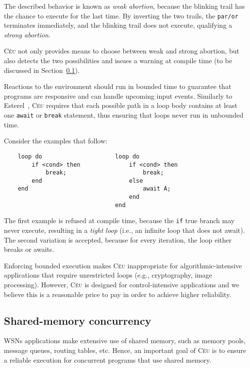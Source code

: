 \documentclass[10pt]{sensys-proc}
\newcommand{\CEU}{\textsc{C\'{e}u}\xspace}
\newcommand{\code}[1] {{\small{\texttt{#1}}}}
\begin{document}
The described behavior is known as \emph{weak abortion}, because the blinking 
trail has the chance to execute for the last time.
By inverting the two trails, the \code{par/or} terminates immediately, and the 
blinking trail does not execute, qualifying a \emph{strong 
abortion}.~\cite{esterel.preemption}

\CEU not only provides means to choose between weak and strong abortion, but 
also detects the two possibilities and issues a warning at compile time (to be 
discussed in Section~\ref{sec.ceu.shared}).

Reactions to the environment should run in bounded time to guarantee that 
programs are responsive and can handle upcoming input events.
Similarly to Esterel~\cite{esterel.ieee91}, \CEU requires that each possible 
path in a loop body contains at least one \code{await} or \code{break} 
statement, thus ensuring that loops never run in unbounded time.

Consider the examples that follow:

{\small
\begin{verbatim}
    loop do                     loop do
        if <cond> then              if <cond> then
            break;                      break;
        end                         else
    end                                 await A;
                                    end
                                end
\end{verbatim}
}

The first example is refused at compile time, because the \code{if} true branch 
may never execute, resulting in a \emph{tight loop} (i.e., an infinite loop 
that does not await).
The second variation is accepted, because for every iteration, the loop either 
breaks or awaits.

Enforcing bounded execution makes \CEU inappropriate for algorithmic-intensive 
applications that require unrestricted loops (e.g., cryptography, image 
processing).
However, \CEU is designed for control-intensive applications and we believe 
this is a reasonable price to pay in order to achieve higher reliability.


\subsection{Shared-memory concurrency}
\label{sec.ceu.shared}

WSNs applications make extensive use of shared memory, such as memory pools, 
message queues, routing tables, etc.
Hence, an important goal of \CEU is to ensure a reliable execution for 
concurrent programs that use shared memory.
\end{document}
